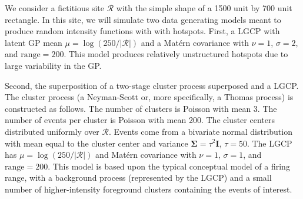 \documentclass[review]{elsarticle}
\begin{document}
We consider a fictitious site \(\mathcal{R}\) with the simple shape of a 1500
unit by 700 unit rectangle. In this site, we will simulate two data generating
models meant to produce random intensity functions with with hotspots. First,
a LGCP with latent GP mean \(\mu = \log(250 / |\mathcal{R}|)\) and a
Mat\'{e}rn covariance with \(\nu = 1\), \(\sigma = 2\), and
\(\text{range} = 200\). This model produces relatively unstructured hotspots
due to large variability in the GP.

Second, the superposition of a two-stage cluster process superposed and a
LGCP. The cluster process (a Neyman-Scott or, more specifically, a Thomas
process) is constructed as follows. The number of clusters is Poisson with
mean 3. The number of events per cluster is Poisson with mean 200. The cluster
centers distributed uniformly over \(\mathcal{R}\). Events come from a
bivariate normal distribution with mean equal to the cluster center and
variance \(\boldsymbol{\Sigma} = \tau^{2}\mathbf{I}\), \(\tau = 50\). The LGCP
has \(\mu = \log(250 / |\mathcal{R}|)\) and Mat\'{e}rn covariance with
\(\nu = 1\), \(\sigma = 1\), and \(\text{range} = 200\). This model is based
upon the typical conceptual model of a firing range, with a background process
(represented by the LGCP) and a small number of higher-intensity foreground
clusters containing the events of interest.
\end{document}
